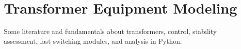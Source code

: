 




\chapter{Transformer Equipment Modeling}


Some literature and fundamentals about transformers, control, stability assessment, fast-switching modules, and analysis in Python. 



